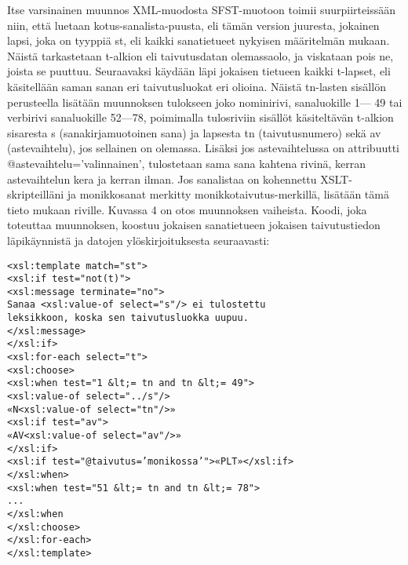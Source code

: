 \documentclass[free]{flammie}
\begin{document}
Itse varsinainen muunnos XML-muodosta SFST-muotoon toimii suurpiirteissään
niin, että luetaan kotus-sanalista-puusta, eli tämän version juuresta, jokainen lapsi, joka on tyyppiä st, eli kaikki sanatietueet nykyisen määritelmän mukaan. Näistä tarkastetaan t-alkion eli taivutusdatan olemassaolo, ja viskataan pois
ne, joista se puuttuu. Seuraavaksi käydään läpi jokaisen tietueen kaikki t-lapset,
eli käsitellään saman sanan eri taivutusluokat eri olioina. Näistä tn-lasten sisällön perusteella lisätään muunnoksen tulokseen joko nominirivi, sanaluokille 1—
49 tai verbirivi sanaluokille 52—78, poimimalla tulosriviin sisällöt käsiteltävän
t-alkion sisaresta s (sanakirjamuotoinen sana) ja lapsesta tn (taivutusnumero)
sekä av (astevaihtelu), jos sellainen on olemassa. Lisäksi jos astevaihtelussa on
attribuutti @astevaihtelu=’valinnainen’, tulostetaan sama sana kahtena rivinä, kerran astevaihtelun kera ja kerran ilman. Jos sanalistaa on kohennettu
XSLT-skripteilläni ja monikkosanat merkitty monikkotaivutus-merkillä, lisätään
tämä tieto mukaan riville. Kuvassa 4 on otos muunnoksen vaiheista. Koodi, joka toteuttaa muunnoksen, koostuu jokaisen sanatietueen jokaisen taivutustiedon
läpikäynnistä ja datojen ylöskirjoituksesta seuraavasti:

\begin{verbatim}
<xsl:template match="st">
<xsl:if test="not(t)">
<xsl:message terminate="no">
Sanaa <xsl:value-of select="s"/> ei tulostettu
leksikkoon, koska sen taivutusluokka uupuu.
</xsl:message>
</xsl:if>
<xsl:for-each select="t">
<xsl:choose>
<xsl:when test="1 &lt;= tn and tn &lt;= 49">
<xsl:value-of select="../s"/>
«N<xsl:value-of select="tn"/>»
<xsl:if test="av">
«AV<xsl:value-of select="av"/>»
</xsl:if>
<xsl:if test="@taivutus=’monikossa’">«PLT»</xsl:if>
</xsl:when>
<xsl:when test="51 &lt;= tn and tn &lt;= 78">
...
</xsl:when
</xsl:choose>
</xsl:for-each>
</xsl:template>
\end{verbatim}
\end{document}
